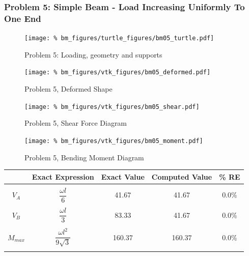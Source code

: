 \subsubsection{Problem 5: Simple Beam - Load Increasing Uniformly To One End}
\begin{figure}[h]
    \texttt{[image: \%
                            bm\_figures/turtle\_figures/bm05\_turtle.pdf]}
    \centering
    \caption{Problem 5: Loading, geometry and supports}
    \label{fig:bm05_turtle}
\end{figure}


\begin{figure}[!htb]
    \texttt{[image: \%
                     bm\_figures/vtk\_figures/bm05\_deformed.pdf]}
    \centering
    \caption{Problem 5, Deformed Shape}
    \label{fig:bm05_deformed}
\end{figure}
\begin{figure}[!htb]
    \texttt{[image: \%
                     bm\_figures/vtk\_figures/bm05\_shear.pdf]}
    \centering
    \caption{Problem 5, Shear Force Diagram}
    \label{fig:bm05_shear}
\end{figure}
\begin{figure}[!htb]
    \texttt{[image: \%
                     bm\_figures/vtk\_figures/bm05\_moment.pdf]}
    \centering
    \caption{Problem 5, Bending Moment Diagram}
    \label{fig:bm05_moment}
\end{figure}
\begin{table}[h!]
\centering
\begin{tabular}{ c| c c c c }
    & Exact Expression & Exact Value & Computed Value & \% RE \\ \hline \\
    $V_A$   & $\dfrac{\omega l}{6}$ &  41.67 & 41.67 & 0.0\% \\ \\
    $V_B$  & $\dfrac{ \omega l}{3}$ &  83.33 & 41.67 & 0.0\% \\ \\
    $M_{max}$ & $\dfrac{\omega l^2}{9\sqrt{3}}$ &  160.37 & 160.37 & 0.0\% \\ \\
\end{tabular}
\end{table}

%
%

\clearpage
